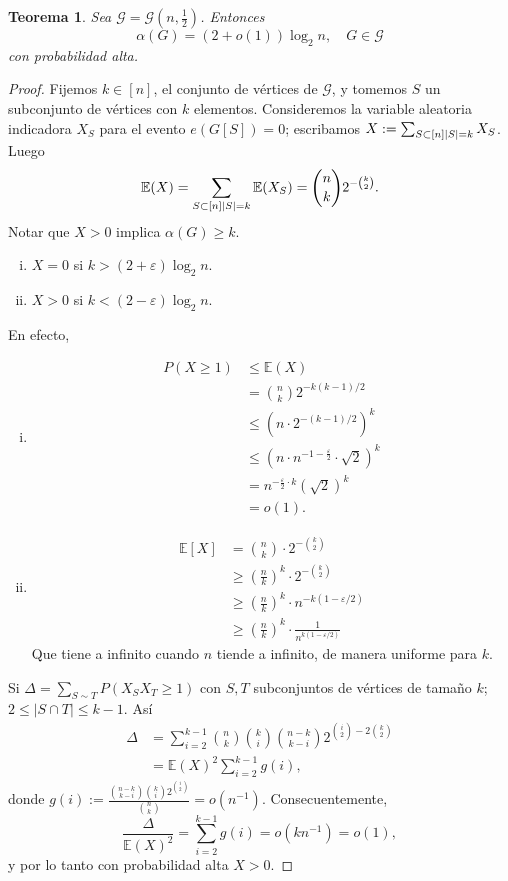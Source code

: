 \documentclass[12pt]{report}
\theoremstyle{plain}
\newtheorem{theorem}{Teorema}[section]
\theoremstyle{definition}
\newcommand{\abs}[1]{\left \vert #1 \right \vert}
\begin{document}
\begin{theorem}
Sea $\mathcal G = \mathcal G (n, \frac 1 2)$. Entonces
\[
    \alpha (G) = (2 + o(1)) \log_2 n, \quad G \in \mathcal G
\]
con probabilidad alta.
\end{theorem}
\begin{proof}
Fijemos $k \in [n]$, el conjunto de vértices de $\mathcal G$, y tomemos $S$ un subconjunto de vértices con $k$ elementos. Consideremos la variable aleatoria indicadora $X_S$ para el evento $e(G[S]) = 0$; escribamos $X := \sum_{\substack{S \subset [n]}\\ \abs S = k} X_S$. Luego
\[
    \mathbb{E}  (X) = \sum_{\substack{S \subset [n]} \\ \abs{S} = k} \mathbb{E}(X_S)  = \binom n k 2^{- \binom k 2}.
\]
Notar que $X > 0$ implica $\alpha (G) \geq k$.
\begin{enumerate}[(i)]
\item $X = 0$ si $k > (2 + \varepsilon) \log_2 n$.
\item $X > 0$ si $k < (2- \varepsilon) \log _2 n$.
\end{enumerate}
En efecto,
\begin{enumerate}[(i)]
\item
\begin{align*}
P(X \geq 1) &\leq \mathbb{E} (X ) \\
&= \binom n k 2^{-k (k-1)/2} \\
&\leq \left ( n \cdot 2^{- (k-1)/2} \right)^k \\
&\leq \left ( n \cdot n^{-1 - \frac \varepsilon 2} \cdot \sqrt 2 \right )^k \\
&= n^{-\frac \varepsilon 2 \cdot k} (\sqrt 2 )^k \\
&= o(1).
\end{align*}
\item \begin{align*}
\mathbb{E}[X] &= \binom n k \cdot 2^{- \binom k 2} \\
&\geq \left ( \frac n k \right )^k \cdot 2^{- \binom k 2} \\
& \geq \left ( \frac n k \right )^k \cdot n^{-k ( 1 - \varepsilon /2)} \\
& \geq \left ( \frac n k \right )^k \cdot \frac{1}{n^{k ( 1 - \varepsilon /2)}}
\end{align*}
Que tiene a infinito cuando $n$ tiende a infinito, de manera uniforme para $k$.
\end{enumerate}

Si $\Delta = \sum_{S \sim T} P (X_S X_T \geq 1)$ con $S,T$ subconjuntos de vértices de tamaño $k$; $2 \leq \abs{S \cap T} \leq k-1$. Así
\begin{align*}
\Delta &= \sum_{i = 2}^{k-1} \binom n k \binom k i \binom {n-k}{k-i} 2^{\binom i 2 - 2 \binom k 2} \\
&= \mathbb{E}(X)^2 \sum_{i = 2}^{k-1} g (i),
\end{align*}
donde $g(i) := \frac{\binom {n-k}{k-i} \binom k i 2^{\binom i 2}}{\binom n k} = o(n^{-1})$.
Consecuentemente,
\[
    \frac{\Delta}{\mathbb{E}(X)^2} = \sum_{i = 2}^{k-1} g(i) = o (k n^{-1} )= o(1),
\]
y por lo tanto con probabilidad alta $X > 0$.
\end{proof}
\end{document}

